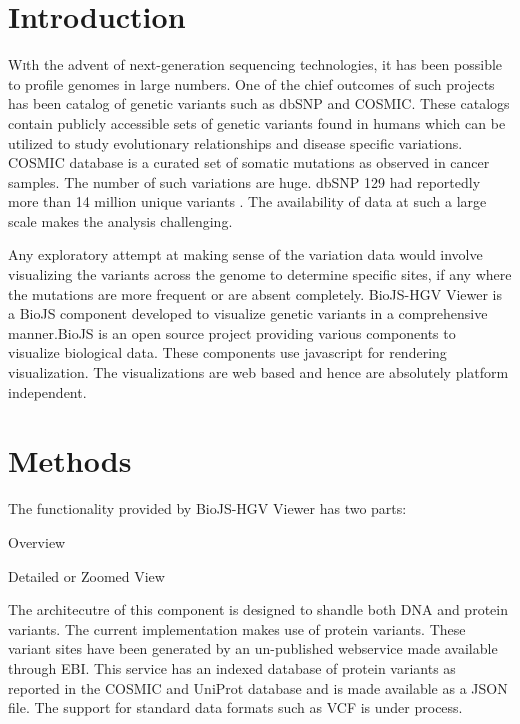 \documentclass[twoside]{article}
\begin{document}
\begin{multicols}{2} %

\section{Introduction}

\lettrine[nindent=0em,lines=3]{W} 
ith the advent of next-generation sequencing technologies, it has been possible to profile genomes in large numbers. One of the chief outcomes of such projects has been catalog of genetic variants such as dbSNP\cite{Smigielski2000} and COSMIC\cite{Forbes2011}. These catalogs contain publicly accessible sets of genetic variants found in humans which can be utilized to  study evolutionary relationships and disease specific variations. COSMIC database is a curated set of somatic mutations as observed in cancer samples. The number of such variations are   huge. dbSNP 129 had reportedly more than 14 million unique variants \cite{ncbiweb}. The availability of data at such a large scale makes the analysis challenging.

Any exploratory attempt at making sense of the variation data would involve visualizing the variants across the genome to determine specific sites, if any where the mutations are more frequent or are absent completely. 
 BioJS-HGV Viewer is a BioJS \cite{Corpas2014} component developed to visualize genetic variants in a comprehensive manner.BioJS is an open source project providing various components to visualize biological data. These components use javascript for rendering visualization. The visualizations are web based and hence are absolutely platform independent.
 
 

\section{Methods}
The functionality provided by BioJS-HGV Viewer has two parts:\\
\begin{compactitem}
\item Overview
\item Detailed or Zoomed View

The architecutre of this component is designed to shandle both DNA and protein variants. The current implementation makes use of protein variants. These variant sites have been generated by an un-published webservice made available through EBI. This service has an indexed database of protein variants as reported in the COSMIC and UniProt\cite{uniprot} database and is made available as a JSON\cite{json} file. The support for standard data formats such as VCF\cite{vcf} is under process.

\end{compactitem}
\end{multicols}
\end{document}
